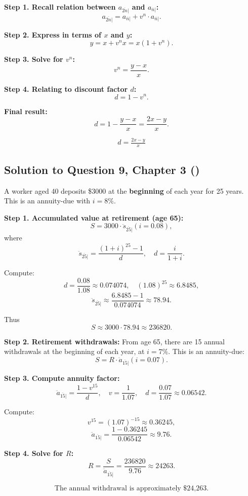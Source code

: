 \documentclass[12pt, a4paper]{article}
\begin{document}
\textbf{Step 1. Recall relation between $a_{\overline{2n}|}$ and $a_{\overline{n}|}$:}
\[
a_{\overline{2n}|} = a_{\overline{n}|} + v^n \cdot a_{\overline{n}|}.
\]

\textbf{Step 2. Express in terms of $x$ and $y$:}
\[
y = x + v^n x = x(1+v^n).
\]

\textbf{Step 3. Solve for $v^n$:}
\[
v^n = \frac{y-x}{x}.
\]

\textbf{Step 4. Relating to discount factor $d$:}
\[
d = 1-v^n.
\]

\textbf{Final result:}
\[
d = 1 - \frac{y-x}{x} = \frac{2x-y}{x}.
\]

\[
\boxed{d = \tfrac{2x-y}{x}}
\]

\subsection*{Solution to Question 9, Chapter 3 (\cite{toi3rd})}

A worker aged 40 deposits \$3000 at the \textbf{beginning} of each year for 25 years.  
This is an annuity-due with $i=8\%$.

\textbf{Step 1. Accumulated value at retirement (age 65):}
\[
S = 3000 \cdot \ddot{s}_{\overline{25}|}(i=0.08),
\]
where
\[
\ddot{s}_{\overline{25}|} = \frac{(1+i)^{25}-1}{d}, 
\quad d = \frac{i}{1+i}.
\]

Compute:
\[
d = \frac{0.08}{1.08} \approx 0.074074,
\quad (1.08)^{25} \approx 6.8485,
\]
\[
\ddot{s}_{\overline{25}|} \approx \frac{6.8485-1}{0.074074} \approx 78.94.
\]

Thus
\[
S \approx 3000 \cdot 78.94 \approx 236820.
\]

\textbf{Step 2. Retirement withdrawals:}  
From age 65, there are 15 annual withdrawals at the beginning of each year, at $i=7\%$.  
This is an annuity-due:
\[
S = R \cdot \ddot{a}_{\overline{15}|}(i=0.07).
\]

\textbf{Step 3. Compute annuity factor:}
\[
\ddot{a}_{\overline{15}|} = \frac{1-v^{15}}{d}, 
\quad v=\frac{1}{1.07}, 
\quad d=\frac{0.07}{1.07} \approx 0.06542.
\]

Compute:
\[
v^{15} = (1.07)^{-15} \approx 0.36245,
\]
\[
\ddot{a}_{\overline{15}|} = \frac{1-0.36245}{0.06542} \approx 9.76.
\]

\textbf{Step 4. Solve for $R$:}
\[
R = \frac{S}{\ddot{a}_{\overline{15}|}} 
= \frac{236820}{9.76} \approx 24263.
\]

\[
\boxed{\text{The annual withdrawal is approximately \$24{,}263.}}
\]
\end{document}
